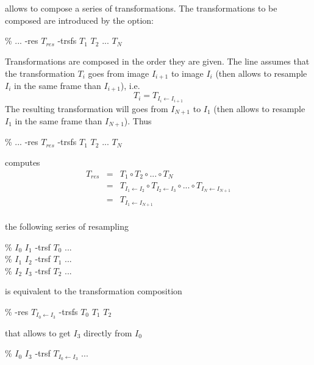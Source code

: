 \section{\composeTrsf}


\composeTrsf allows to compose a series of transformations. The transformations to be composed are introduced by the  option:
\begin{code}{1}
\% \composeTrsf ... -res $T_{res}$ -trsfs  $T_1$ $T_2$ ... $T_N$
\end{code}


Transformations are composed in the order they are given.
The line  assumes that the transformation
$T_i$ goes from image $I_{i+1}$ to image $I_{i}$ (then allows to resample
$I_{i}$ in the same frame than $I_{i+1}$), i.e.  
$$T_{i} = T_{I_{i} \leftarrow I_{i+1}}$$
The resulting transformation will goes from $I_{N+1}$ to $I_1$ 
(then allows to resample $I_1$ in the same frame than $I_{N+1}$). Thus 
\begin{code}{1}
\% \composeTrsf ... -res $T_{res}$ -trsfs  $T_1$ $T_2$ ... $T_N$
\end{code}
computes
\begin{eqnarray*}
T_{res} & = & T_1 \circ T_2 \circ ... \circ T_N \\
& = & T_{I_{1} \leftarrow I_{2}} \circ  
      T_{I_{2} \leftarrow I_{3}} \circ  ... \circ 
      T_{I_{N} \leftarrow I_{N+1}} \\
& = & T_{I_{1} \leftarrow I_{N+1}} \\
\end{eqnarray*}


 the following series of resampling
\begin{code}{1}
\% \applyTrsf $I_0$ $I_1$ -trsf $T_0$ ... \\
\% \applyTrsf $I_1$ $I_2$ -trsf $T_1$ ... \\
\% \applyTrsf $I_2$ $I_3$ -trsf $T_2$ ...
\end{code}
is equivalent to the transformation composition
\begin{code}{1}
\% \composeTrsf -res $T_{I_0 \leftarrow I_3}$ -trsfs $T_0$ $T_1$ $T_2$
\end{code}
that allows to get $I_3$ directly from $I_0$
\begin{code}{1}
\% \applyTrsf $I_0$ $I_3$ -trsf $T_{I_0 \leftarrow I_3}$ ... 
\end{code}


